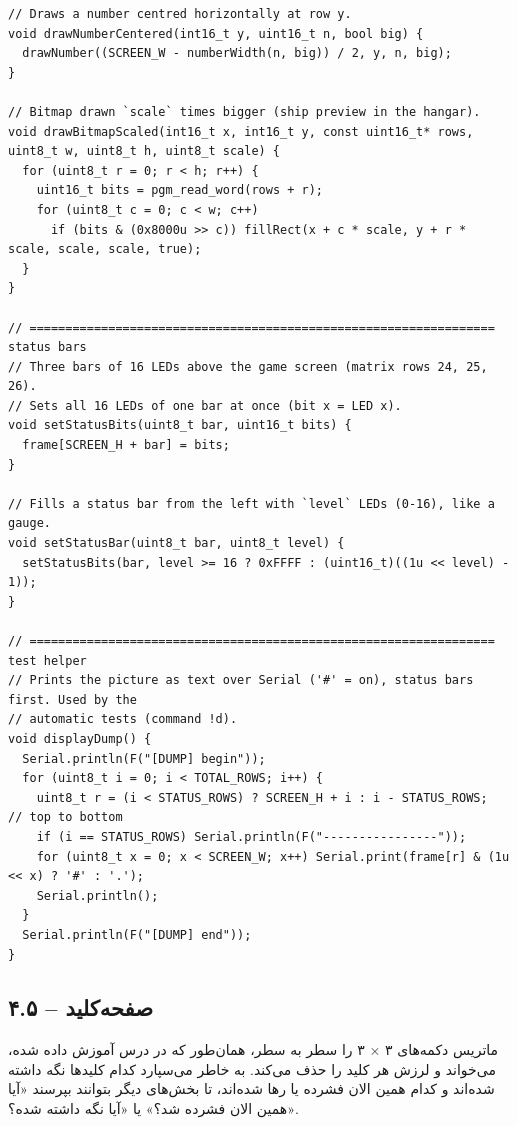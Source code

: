 \documentclass[11pt,a4paper]{article}
\begin{document}
\begin{latin}
\begin{lstlisting}[language=Arduino]
// Draws a number centred horizontally at row y.
void drawNumberCentered(int16_t y, uint16_t n, bool big) {
  drawNumber((SCREEN_W - numberWidth(n, big)) / 2, y, n, big);
}

// Bitmap drawn `scale` times bigger (ship preview in the hangar).
void drawBitmapScaled(int16_t x, int16_t y, const uint16_t* rows, uint8_t w, uint8_t h, uint8_t scale) {
  for (uint8_t r = 0; r < h; r++) {
    uint16_t bits = pgm_read_word(rows + r);
    for (uint8_t c = 0; c < w; c++)
      if (bits & (0x8000u >> c)) fillRect(x + c * scale, y + r * scale, scale, scale, true);
  }
}

// ================================================================= status bars
// Three bars of 16 LEDs above the game screen (matrix rows 24, 25, 26).
// Sets all 16 LEDs of one bar at once (bit x = LED x).
void setStatusBits(uint8_t bar, uint16_t bits) {
  frame[SCREEN_H + bar] = bits;
}

// Fills a status bar from the left with `level` LEDs (0-16), like a gauge.
void setStatusBar(uint8_t bar, uint8_t level) {
  setStatusBits(bar, level >= 16 ? 0xFFFF : (uint16_t)((1u << level) - 1));
}

// ================================================================= test helper
// Prints the picture as text over Serial ('#' = on), status bars first. Used by the
// automatic tests (command !d).
void displayDump() {
  Serial.println(F("[DUMP] begin"));
  for (uint8_t i = 0; i < TOTAL_ROWS; i++) {
    uint8_t r = (i < STATUS_ROWS) ? SCREEN_H + i : i - STATUS_ROWS;   // top to bottom
    if (i == STATUS_ROWS) Serial.println(F("----------------"));
    for (uint8_t x = 0; x < SCREEN_W; x++) Serial.print(frame[r] & (1u << x) ? '#' : '.');
    Serial.println();
  }
  Serial.println(F("[DUMP] end"));
}
\end{lstlisting}

\end{latin}

\clearpage
\subsection*{۴.۵  – صفحه‌کلید}
ماتریس دکمه‌های ۳ × ۳ را سطر به سطر، همان‌طور که در درس آموزش داده شده، می‌خواند و لرزش هر کلید را حذف می‌کند. به خاطر می‌سپارد کدام کلیدها نگه داشته شده‌اند و کدام همین الان فشرده یا رها شده‌اند، تا بخش‌های دیگر بتوانند بپرسند «آیا  همین الان فشرده شد؟» یا «آیا  نگه داشته شده؟».
\end{document}
